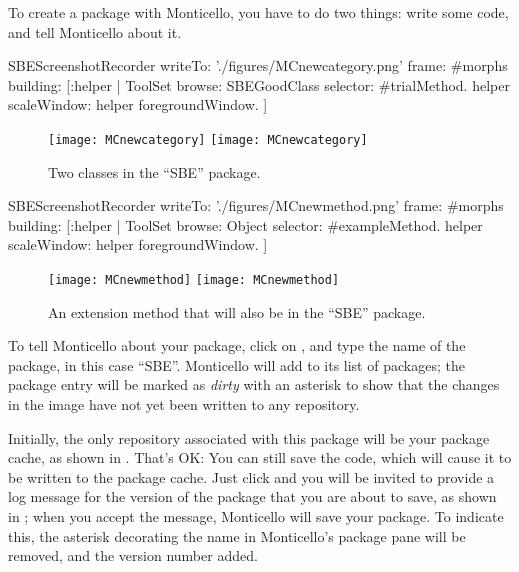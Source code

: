 \documentclass[a4paper,10pt,twoside]{book}
\begin{document}
To create a package with Monticello, you have to do two things: write some code, and tell Monticello about it.


\begin{ExecuteSmalltalkScript}
SBEScreenshotRecorder writeTo: './figures/MCnewcategory.png' frame: #morphs building: [:helper |
	ToolSet browse: SBEGoodClass selector: #trialMethod.
	helper scaleWindow: helper foregroundWindow.
]
\end{ExecuteSmalltalkScript}
\begin{figure}[btp]
	\begin{center}
	\ifluluelse
		{\texttt{[image: MCnewcategory]}}
		{\texttt{[image: MCnewcategory]}}
	\end{center}
	\caption{Two classes in the ``SBE'' package.}
	\label{fig:MCnewcategory}
\end{figure}

\begin{ExecuteSmalltalkScript}
SBEScreenshotRecorder writeTo: './figures/MCnewmethod.png' frame: #morphs building: [:helper |
	ToolSet browse: Object selector: #exampleMethod.
	helper scaleWindow: helper foregroundWindow.
]
\end{ExecuteSmalltalkScript}
\begin{figure}[btp]
	\begin{center}
	\ifluluelse
		{\texttt{[image: MCnewmethod]}}
		{\texttt{[image: MCnewmethod]}}
	\end{center}
	\caption{An extension method that will also be in the ``SBE'' package.}
	\label{fig:MCnewmethod}
\end{figure}

To tell Monticello about your package, click on , and type the name of the package, in this case ``SBE''.
Monticello will add  to its list of packages; the package entry will be marked as \emph{dirty} with an asterisk to show that the changes in the image have not yet been written to any repository.

Initially, the only repository associated with this package will be your package cache, as shown in .
That's OK:
You can still save the code, which will cause it to be written to the package cache.
Just click  and you will be invited to provide a log message for the version of the package that you are about to save, as shown in ; when you accept the message, Monticello will save your package.
To indicate this, the asterisk decorating the name in Monticello's package pane will be removed, and the version number added.
\end{document}
